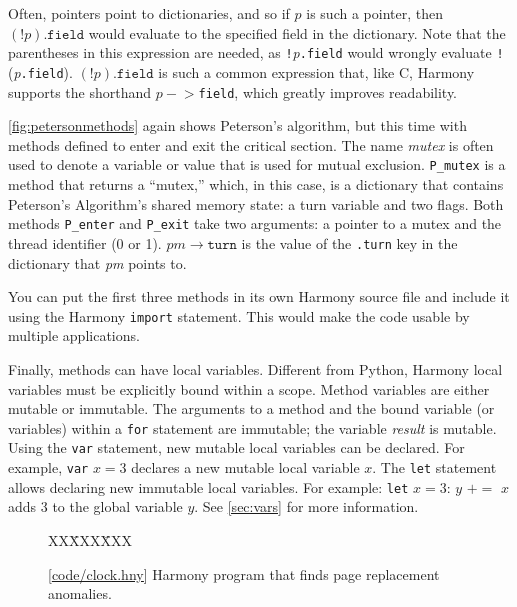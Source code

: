 \documentclass{report}
\newcommand{\harmonysource}[1]{
\begin{tabbing}
XX\=XXX\=XXX\kill
    
\end{tabbing}
}
\newcommand{\harmonylink}[1]{%
[\href{https://harmony.cs.cornell.edu/#1}{\underline{#1}}]%
}
\newenvironment{code}{
\tcolorbox
}{
\endtcolorbox
}
\begin{document}
Often, pointers point to dictionaries, and so if $p$ is such a pointer,
then $(!p).\mathtt{field}$ would evaluate to the specified field in the dictionary.
Note that the parentheses in this expression
are needed, as \texttt{!}\textit{p}\texttt{.field} would wrongly evaluate
\texttt{!}(\textit{p}\texttt{.field}).
$(!p).\mathtt{field}$ is such a common expression that, like C, Harmony supports the
shorthand $p-$$>$\texttt{field}, which greatly improves readability.

\autoref{fig:petersonmethods} again shows Peterson's algorithm,
but this time with methods defined to enter and exit the critical
section.
The name \textit{mutex} is often used to denote a variable or value
that is used for mutual exclusion.
\texttt{P\_mutex} is a method that returns a ``mutex,'' which, in this
case, is a dictionary that contains Peterson's Algorithm's shared memory state:
a turn variable and two flags.
Both methods \texttt{P\_enter} and \texttt{P\_exit} take two arguments:
a pointer to a mutex and the thread identifier (0 or 1).
$\mathit{pm}$$\rightarrow$$\mathtt{turn}$ is the value of the \texttt{.turn} key
in the dictionary that \textit{pm} points to. 

You can put the first three methods in its own Harmony source file
and include it using the Harmony \texttt{import} statement.
%
%
This would make the code usable by multiple applications.

Finally, methods can have local variables.
Different from Python, Harmony local variables must be
explicitly bound within a scope.
Method variables are either mutable or immutable.
The arguments to a method and the bound variable (or
variables) within a \texttt{for} statement are immutable;
the variable \textit{result} is mutable.
Using the \texttt{var} statement, new mutable local variables can be
declared.
For example, \texttt{var} $x = 3$ declares a new mutable local variable
$x$.
The \texttt{let} statement allows declaring new immutable local variables.
For example:
\texttt{let} $x = 3$: $y$ $+$$=$ $x$ adds 3 to the global variable
$y$.
See \autoref{sec:vars} for more information.

\begin{figure}
\begin{code}
\harmonysource{clock}
\end{code}
\caption{\harmonylink{code/clock.hny} Harmony program that finds page replacement anomalies.}
\label{fig:clock}
\end{figure}
\end{document}
